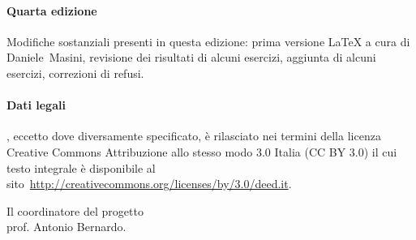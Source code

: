 \paragraph{Quarta edizione} Modifiche sostanziali presenti in questa edizione: prima versione \LaTeX{} a cura di Daniele~Masini, revisione dei risultati di alcuni esercizi, aggiunta di alcuni esercizi, correzioni di refusi.

\paragraph{Dati legali} \serie{}, eccetto dove diversamente specificato, è rilasciato nei termini della licenza Creative Commons Attribuzione allo stesso modo 3.0 Italia (CC BY 3.0) il cui testo integrale è disponibile al sito~\url{http://creativecommons.org/licenses/by/3.0/deed.it}.

\begin{flushright}
Il coordinatore del progetto\\
prof. Antonio Bernardo.
\end{flushright}

\cleardoublepage
